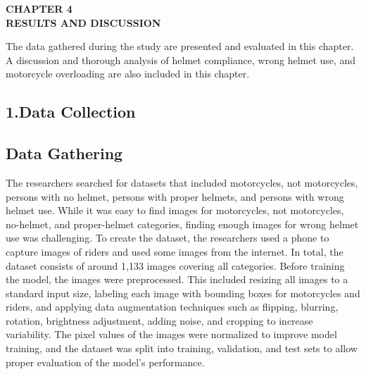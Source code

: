 
\begin{center}
\textbf{\MakeUppercase{Chapter 4}}\\[1em]
\textbf{\MakeUppercase{Results and Discussion}}
\end{center}

The data gathered during the study are presented and evaluated in this chapter. A discussion and thorough analysis of helmet compliance, wrong helmet use, and motorcycle overloading are also included in this chapter.
\begin{refsection}

\subsection{1.Data Collection}
\subsection{Data Gathering}
The researchers searched for datasets that included motorcycles, not motorcycles, persons with no helmet, persons with proper helmets, and persons with wrong helmet use. While it was easy to find images for motorcycles, not motorcycles, no-helmet, and proper-helmet categories, finding enough images for wrong helmet use was challenging. To create the dataset, the researchers used a phone to capture images of riders and used some images from the internet. In total, the dataset consists of around 1,133 images covering all categories. Before training the model, the images were preprocessed. This included resizing all images to a standard input size, labeling each image with bounding boxes for motorcycles and riders, and applying data augmentation techniques such as flipping, blurring, rotation, brightness adjustment, adding noise, and cropping to increase variability. The pixel values of the images were normalized to improve model training, and the dataset was split into training, validation, and test sets to allow proper evaluation of the model’s performance.


\end{refsection}
